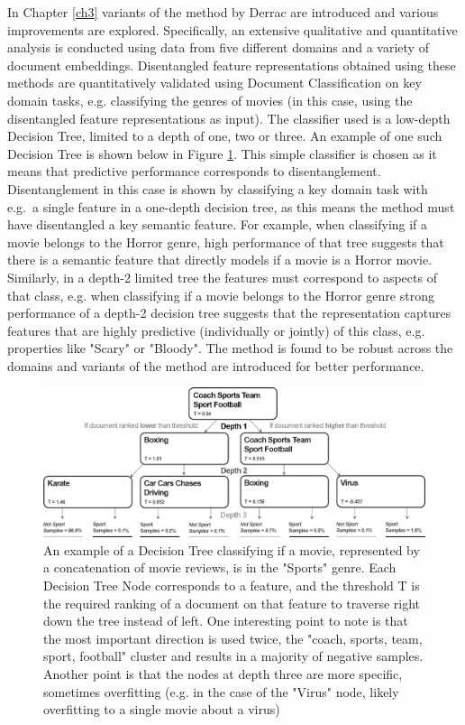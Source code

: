 In Chapter \ref{ch3} variants of the method by Derrac \cite{Derrac2015} are introduced and various improvements are explored. Specifically, an extensive qualitative and quantitative analysis is conducted using data from five different domains and a variety of document embeddings. Disentangled feature representations obtained using these methods are quantitatively validated using Document Classification on key domain tasks, e.g. classifying the genres of movies (in this case, using the disentangled feature representations as input). The classifier used is a low-depth Decision Tree, limited to a depth of one, two or three. An example of one such Decision Tree is shown below in Figure \ref{ch1:DecisionTree}. This simple classifier is chosen as it means that predictive performance corresponds to disentanglement. Disentanglement in this case is shown by classifying a key domain task with e.g.\ a single feature in a one-depth decision tree, as this means the method must have disentangled a key semantic feature. For example, when classifying if a movie belongs to the Horror genre,  high performance of that tree suggests that there is a semantic feature that directly models if a movie is a Horror movie. Similarly, in a depth-2 limited tree the features must correspond to aspects of that class, e.g. when classifying if a movie belongs to the Horror genre strong performance of a depth-2 decision tree suggests that the representation captures features that are highly predictive (individually or jointly) of this class, e.g. properties like "Scary" or "Bloody". The method is found to be robust across the domains and variants of the method are introduced for better performance.

\begin{figure}[t]
	\includegraphics[width=450px]{images/decision_tree_ex.png}
	\centering
	\caption{An example of a Decision Tree classifying if a movie, represented by a concatenation of movie reviews, is in the "Sports" genre. Each Decision Tree Node corresponds to a feature, and the threshold T is the required ranking of a document on that feature to traverse right down the tree instead of left. One interesting point to note is that the most important direction is used twice, the "coach, sports, team, sport, football" cluster and results in a majority of negative samples. Another point is that the nodes at depth three are more specific, sometimes overfitting (e.g. in the case of the "Virus" node, likely overfitting to a single movie about a virus) }\label{ch1:DecisionTree}
\end{figure}

